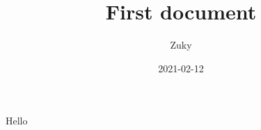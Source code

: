 \documentclass{article}
\title{First document}
\date{2021-02-12}
\author{Zuky}
\begin{document}
	\maketitle
	\newpage
	Hello
\end{document}
